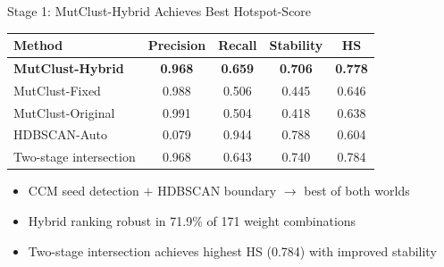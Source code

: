 \documentclass[aspectratio=169,11pt]{beamer}
\begin{document}
\begin{frame}{\textcolor{stage1blue}{Stage 1:} MutClust-Hybrid Achieves Best Hotspot-Score}

\begin{center}
\begin{tabular}{lcccc}
\toprule
\textbf{Method} & \textbf{Precision} & \textbf{Recall} & \textbf{Stability} & \textbf{HS} \\
\midrule
\rowcolor{pahdgreen!12}
\textbf{MutClust-Hybrid} & \textbf{0.968} & \textbf{0.659} & \textbf{0.706} & \textbf{0.778} \\
MutClust-Fixed & 0.988 & 0.506 & 0.445 & 0.646 \\
MutClust-Original & 0.991 & 0.504 & 0.418 & 0.638 \\
HDBSCAN-Auto & 0.079 & 0.944 & 0.788 & 0.604 \\
\midrule
Two-stage intersection & 0.968 & 0.643 & 0.740 & 0.784 \\
\bottomrule
\end{tabular}
\end{center}

\vspace{0.5em}
\begin{itemize}
  \item CCM seed detection $+$ HDBSCAN boundary $\to$ best of both worlds
  \item Hybrid ranking robust in \alert{71.9\%} of 171 weight combinations
  \item Two-stage intersection achieves highest HS (0.784) with improved stability
\end{itemize}
\end{frame}
\end{document}
